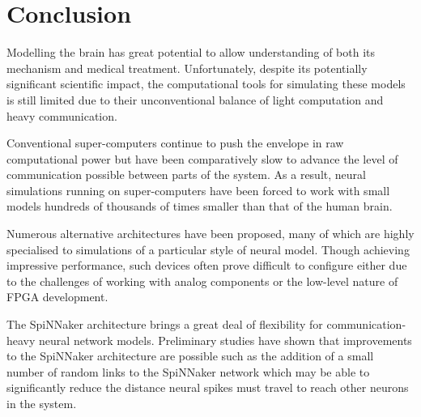 \chapter{Conclusion}
	
	
	Modelling the brain has great potential to allow understanding of both its
	mechanism and medical treatment. Unfortunately, despite its potentially
	significant scientific impact, the computational tools for simulating these
	models is still limited due to their unconventional balance of light
	computation and heavy communication.
	
	
	Conventional super-computers continue to push the envelope in raw
	computational power but have been comparatively slow to advance the level of
	communication possible between parts of the system. As a result, neural
	simulations running on super-computers have been forced to work with small
	models hundreds of thousands of times smaller than that of the human brain.
	
	Numerous alternative architectures have been proposed, many of which are
	highly specialised to simulations of a particular style of neural model.
	Though achieving impressive performance, such devices often prove difficult to
	configure either due to the challenges of working with analog components or
	the low-level nature of FPGA development.
	
	
	The SpiNNaker architecture brings a great deal of flexibility for
	communication-heavy neural network models. Preliminary studies have shown that
	improvements to the SpiNNaker architecture are possible such as the addition
	of a small number of random links to the SpiNNaker network which may be able
	to significantly reduce the distance neural spikes must travel to reach other
	neurons in the system.
	
